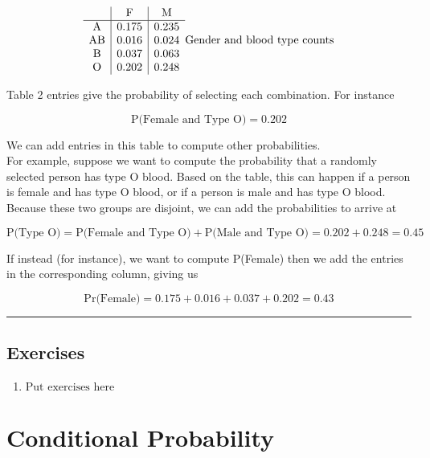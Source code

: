 \documentclass[
]{book}
\providecommand{\tightlist}{%
  \setlength{\itemsep}{0pt}\setlength{\parskip}{0pt}}
\begin{document}
\[
\begin{array}{c|c|c}
           & \mathrm{F} & \mathrm{M}\\ \hline
\mathrm{A} & 0.175 & 0.235 \\ 
\mathrm{AB} & 0.016 & 0.024 \\ 
\mathrm{B} & 0.037 & 0.063 \\ 
\mathrm{O} & 0.202 & 0.248 \\ 
\end{array}\\
\mbox{Gender and blood type counts}
\]

Table 2 entries give the probability of selecting each combination. For instance

\[
\mbox{P(Female and Type O)} = 0.202
\]

We can add entries in this table to compute other probabilities.\\
For example, suppose we want to compute the probability that a randomly selected person has type O blood.
Based on the table, this can happen if a person is female and has type O blood, or if a person is male and has type O blood.
Because these two groups are disjoint, we can add the probabilities to arrive at

\[
\mbox{P(Type O)} = \mbox{P(Female and Type O)} + \mbox{P(Male and Type O)}
= 0.202 + 0.248 = 0.45
\]

If instead (for instance), we want to compute P(Female) then we add the entries in the corresponding column, giving us

\[
\mbox{Pr(Female)} = 0.175 + 0.016 + 0.037 + 0.202 = 0.43 
\]

\begin{center}\rule{0.5\linewidth}{0.5pt}\end{center}

\hypertarget{exercises-1}{%
\section{Exercises}\label{exercises-1}}

\begin{enumerate}
\def\labelenumi{\arabic{enumi}.}
\tightlist
\item
  \(\text{Put exercises here}\)
\end{enumerate}

\hypertarget{conditional-probability}{%
\chapter{Conditional Probability}\label{conditional-probability}}
\end{document}
